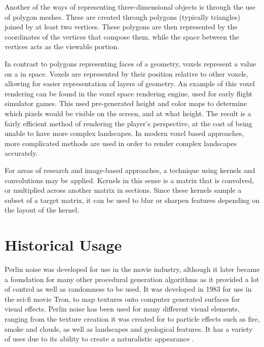 \documentclass[10pt]{report}
\begin{document}
		Another of the ways of representing three-dimensional objects is through the use of polygon meshes. These are created through polygons (typically triangles) joined by at least two vertices. These polygons are then represented by the coordinates of the vertices that compose them, while the space between the vertices acts as the viewable portion.
		
		In contrast to polygons representing faces of a geometry, voxels represent a value on a in space. Voxels are represented by their position relative to other voxels, allowing for easier representation of layers of geometry. An example of this voxel rendering can be found in the voxel space rendering engine, used for early flight simulator games. This used pre-generated height and color maps to determine which pixels would be visible on the screen, and at what height. The result is a fairly efficient method of rendering the player's perspective, at the cost of being unable to have more complex landscapes. In modern voxel based approaches, more complicated methods are used in order to render complex landscapes accurately.
		
		For areas of research and image-based approaches, a technique using kernels and convolutions may be applied. Kernels in this sense is a matrix that is convolved, or multiplied across another matrix in sections. Since these kernels sample a subset of a target matrix, it can be used to blur or sharpen features depending on the layout of the kernel. 
		
	\vspace{10pt}
	\let\clearpage\relax
	\chapter{Historical Usage}
		
		Perlin noise was developed for use in the movie industry, although it later became a foundation for many other procedural generation algorithms as it provided a lot of control as well as randomness to be used. It was developed in 1983 for use in the sci-fi movie Tron, to map textures onto computer generated surfaces for visual effects. Perlin noise has been used for many different visual elements, ranging from the texture creation it was created for to particle effects such as fire, smoke and clouds, as well as landscapes and geological features. It has a variety of uses due to its ability to create a naturalistic appearance \cite{10.1145/325165.325247}.
\end{document}
